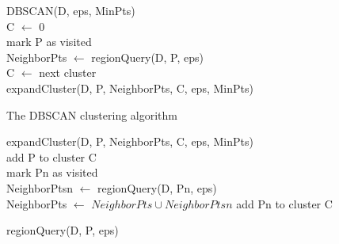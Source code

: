 \begin{algorithm}[h]
\SetAlgoNoEnd
DBSCAN(D, eps, MinPts)\\
	C $\leftarrow$ 0\\
	{
  	mark P as visited\\
		NeighborPts $\leftarrow$ regionQuery(D, P, eps)\\
		{
			C $\leftarrow$ next cluster\\
			expandCluster(D, P, NeighborPts, C, eps, MinPts)
		}
	}
\caption{The DBSCAN clustering algorithm\cite{dbscanwiki}}\label{dbscan-algo}
\phantom{ForLineBreak}
\setcounter{AlgoLine}{0}

expandCluster(D, P, NeighborPts, C, eps, MinPts)\\
	add P to cluster C\\
	{
		{
			mark Pn as visited\\
			NeighborPtsn $\leftarrow$ regionQuery(D, Pn, eps)\\
					{
						NeighborPts $\leftarrow$ $ NeighborPts \cup NeighborPtsn $
					}
		}
					{
						{add Pn to cluster C\\}
					}
	}
\phantom{ForLineBreak}
\setcounter{AlgoLine}{0}

regionQuery(D, P, eps)\\
\end{algorithm}
